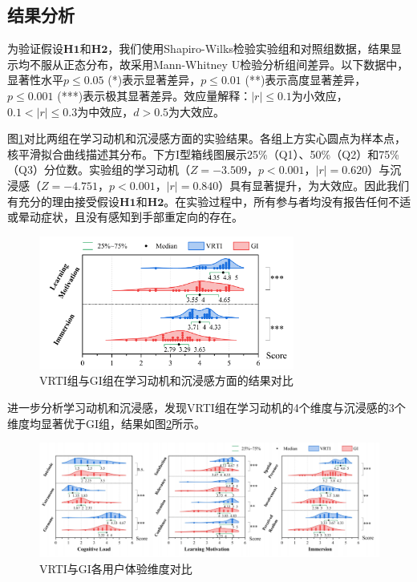 \documentclass[runningheads]{llncs}
\begin{document}
\subsection{结果分析}

为验证假设$\textbf{H1}$和$\textbf{H2}$，我们使用Shapiro-Wilks检验实验组和对照组数据，结果显示均不服从正态分布，故采用Mann-Whitney U检验分析组间差异。以下数据中，显著性水平$p \le 0.05$ (*)表示显著差异，$p \le 0.01$ (**)表示高度显著差异，$p \le 0.001$ (***)表示极其显著差异。效应量解释：$|r| \le 0.1$为小效应，$0.1 < |r| \le  0.3$为中效应，$d > 0.5$为大效应。

图\ref{fig:user-experience-result}对比两组在学习动机和沉浸感方面的实验结果。各组上方实心圆点为样本点，核平滑拟合曲线描述其分布。下方I型箱线图展示25\%（Q1）、50\%（Q2）和75\%（Q3）分位数。实验组的学习动机（$Z=-3.509，p<0.001，|r|=0.620$）与沉浸感（$Z=-4.751，p<0.001，|r|=0.840$）具有显著提升，为大效应。因此我们有充分的理由接受假设$\textbf{H1}$和$\textbf{H2}$。在实验过程中，所有参与者均没有报告任何不适或晕动症状，且没有感知到手部重定向的存在。

\begin{figure}[t]
  \centering
  \includegraphics[width=0.75\textwidth]{image/user-experience-result.pdf}
  \caption{VRTI组与GI组在学习动机和沉浸感方面的结果对比}
  \label{fig:user-experience-result}
\end{figure}

进一步分析学习动机和沉浸感，发现VRTI组在学习动机的4个维度与沉浸感的3个维度均显著优于GI组，结果如图\ref{fig:three-user-experience-result}所示。

\begin{figure}[t]
  \centering
  \includegraphics[width=\textwidth]{image/three-user-experience-result.pdf}
  \caption{VRTI与GI各用户体验维度对比}
  \label{fig:three-user-experience-result}
\end{figure}
\end{document}
